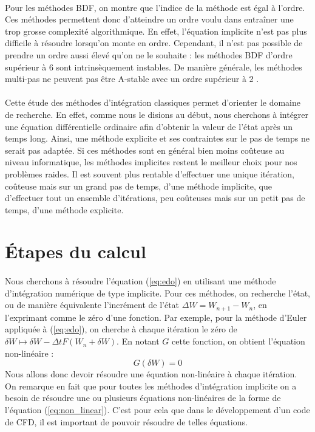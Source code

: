     \paragraph{}
    Pour les méthodes BDF, on montre que l'indice de la méthode est égal à l'ordre.
    Ces méthodes permettent donc d'atteindre un ordre voulu dans entraîner une trop grosse complexité algorithmique.
    En effet, l'équation implicite n'est pas plus difficile à résoudre lorsqu'on monte en ordre.
    Cependant, il n'est pas possible de prendre un ordre aussi élevé qu'on ne le souhaite : les méthodes BDF d'ordre supérieur à 6 sont intrinsèquement instables.
    De manière générale, les méthodes multi-pas ne peuvent pas être A-stable avec un ordre supérieur à 2 \cite{HairerWanner1996}.


\paragraph{}
Cette étude des méthodes d'intégration classiques permet d'orienter le domaine de recherche.
En effet, comme nous le disions au début, nous cherchons à intégrer une équation différentielle ordinaire afin d'obtenir la valeur de l'état après un temps long.
Ainsi, une méthode explicite et ses contraintes sur le pas de temps ne serait pas adaptée.
Si ces méthodes sont en général bien moins coûteuse au niveau informatique, les méthodes implicites restent le meilleur choix pour nos problèmes raides.
Il est souvent plus rentable d'effectuer une unique itération, coûteuse mais sur un grand pas de temps, d'une méthode implicite, que d'effectuer tout un ensemble d'itérations, peu coûteuses mais sur un petit pas de temps, d'une méthode explicite.


\section{Étapes du calcul}

	\paragraph{}
	Nous cherchons à résoudre l'équation (\ref{eq:edo}) en utilisant une méthode d'intégration numérique de type implicite.
  Pour ces méthodes, on recherche l'état, ou de manière équivalente l'incrément de l'état $\Delta W = W_{n+1} - W_n$, en l'exprimant comme le zéro d'une fonction.
  Par exemple, pour la méthode d'Euler appliquée à (\ref{eq:edo}), on cherche à chaque itération le zéro de $\delta W \mapsto \delta W - \Delta t F\left(W_n + \delta W\right)$.
	En notant $G$ cette fonction, on obtient l'équation non-linéaire :
	\begin{equation}\label{eq:non_linear}
		G\left(\delta W\right) = 0
	\end{equation}
	Nous allons donc devoir résoudre une équation non-linéaire à chaque itération.
  On remarque en fait que pour toutes les méthodes d'intégration implicite on a besoin de résoudre une ou plusieurs équations non-linéaires de la forme de l'équation (\ref{eq:non_linear}).
  C'est pour cela que dans le développement d'un code de CFD, il est important de pouvoir résoudre de telles équations.


